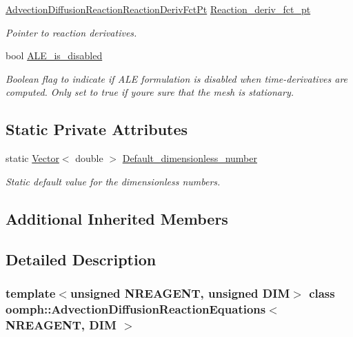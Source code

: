 \begin{DoxyCompactItemize}
\hyperlink{classoomph_1_1AdvectionDiffusionReactionEquations_af7afb472439d8e83b825c0a3c03190a7}{Advection\+Diffusion\+Reaction\+Reaction\+Deriv\+Fct\+Pt} \hyperlink{classoomph_1_1AdvectionDiffusionReactionEquations_a2544062d28d4f81014474ca9e47fa2ac}{Reaction\+\_\+deriv\+\_\+fct\+\_\+pt}
\begin{DoxyCompactList}\small\item\em Pointer to reaction derivatives. \end{DoxyCompactList}\item 
bool \hyperlink{classoomph_1_1AdvectionDiffusionReactionEquations_a1b28c2757c2b2c64030230c3a7a2fb91}{A\+L\+E\+\_\+is\+\_\+disabled}
\begin{DoxyCompactList}\small\item\em Boolean flag to indicate if A\+LE formulation is disabled when time-\/derivatives are computed. Only set to true if you\textquotesingle{}re sure that the mesh is stationary. \end{DoxyCompactList}\end{DoxyCompactItemize}
\subsection*{Static Private Attributes}
\begin{DoxyCompactItemize}
\item 
static \hyperlink{classoomph_1_1Vector}{Vector}$<$ double $>$ \hyperlink{classoomph_1_1AdvectionDiffusionReactionEquations_abac46550a5b363e6b08a7505e689ae18}{Default\+\_\+dimensionless\+\_\+number}
\begin{DoxyCompactList}\small\item\em Static default value for the dimensionless numbers. \end{DoxyCompactList}\end{DoxyCompactItemize}
\subsection*{Additional Inherited Members}


\subsection{Detailed Description}
\subsubsection*{template$<$unsigned N\+R\+E\+A\+G\+E\+NT, unsigned D\+IM$>$\newline
class oomph\+::\+Advection\+Diffusion\+Reaction\+Equations$<$ N\+R\+E\+A\+G\+E\+N\+T, D\+I\+M $>$}

